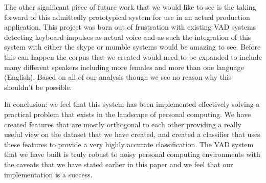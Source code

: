 \documentclass[ %
                    author={Sam Phippen},
                supervisor={Dr. Rafal Bogacz},
                     title={Real time voice activity detectors in noisy personal computing environments},
                  subtitle={},
                    degree={MEng},
                      year={2012} ]{thesis}
\begin{document}
The other significant piece of future work that we would like to see is the
taking forward of this admittedly prototypical system for use in an actual
production application. This project was born out of frustration with existing
VAD systems detecting keyboard impulses as actual voice and as such the
integration of this system with either the skype or mumble systems would be
amazing to see. Before this can happen the corpus that we created would need to
be expanded to include many different speakers including more females and more
than one language (English). Based on all of our analysis though we see no
reason why this shouldn't be possible.

In conclusion: we feel that this system has been implemented effectively
solving a practical problem that exists in the landscape of personal computing.
We have created features that are mostly orthogonal to each other providing a
really useful view on the dataset that we have created, and created a
classifier that uses these features to provide a very highly accurate
classification. The VAD system that we have built is truly robust to noisy
personal computing environments with the caveats that we have stated earlier in
this paper and we feel that our implementation is a success.


%
%
\end{document}
